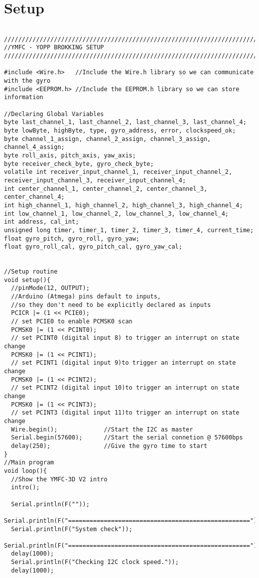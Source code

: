 \section{Setup}

\begin{lstlisting}

///////////////////////////////////////////////////////////////////////////////////////
//YMFC - YOPP BROKKING SETUP
///////////////////////////////////////////////////////////////////////////////////////

#include <Wire.h>   //Include the Wire.h library so we can communicate with the gyro
#include <EEPROM.h> //Include the EEPROM.h library so we can store information

//Declaring Global Variables
byte last_channel_1, last_channel_2, last_channel_3, last_channel_4;
byte lowByte, highByte, type, gyro_address, error, clockspeed_ok;
byte channel_1_assign, channel_2_assign, channel_3_assign, channel_4_assign;
byte roll_axis, pitch_axis, yaw_axis;
byte receiver_check_byte, gyro_check_byte;
volatile int receiver_input_channel_1, receiver_input_channel_2, 
receiver_input_channel_3, receiver_input_channel_4;
int center_channel_1, center_channel_2, center_channel_3, center_channel_4;
int high_channel_1, high_channel_2, high_channel_3, high_channel_4;
int low_channel_1, low_channel_2, low_channel_3, low_channel_4;
int address, cal_int;
unsigned long timer, timer_1, timer_2, timer_3, timer_4, current_time;
float gyro_pitch, gyro_roll, gyro_yaw;
float gyro_roll_cal, gyro_pitch_cal, gyro_yaw_cal;


//Setup routine
void setup(){
  //pinMode(12, OUTPUT);
  //Arduino (Atmega) pins default to inputs, 
  //so they don't need to be explicitly declared as inputs
  PCICR |= (1 << PCIE0);    
  // set PCIE0 to enable PCMSK0 scan
  PCMSK0 |= (1 << PCINT0);  
  // set PCINT0 (digital input 8) to trigger an interrupt on state change
  PCMSK0 |= (1 << PCINT1);  
  // set PCINT1 (digital input 9)to trigger an interrupt on state change
  PCMSK0 |= (1 << PCINT2);  
  // set PCINT2 (digital input 10)to trigger an interrupt on state change
  PCMSK0 |= (1 << PCINT3);  
  // set PCINT3 (digital input 11)to trigger an interrupt on state change
  Wire.begin();             //Start the I2C as master
  Serial.begin(57600);      //Start the serial connetion @ 57600bps
  delay(250);               //Give the gyro time to start 
}
//Main program
void loop(){
  //Show the YMFC-3D V2 intro
  intro();
  
  Serial.println(F(""));
  Serial.println(F("==================================================="));
  Serial.println(F("System check"));
  Serial.println(F("==================================================="));
  delay(1000);
  Serial.println(F("Checking I2C clock speed."));
  delay(1000);
  

\end{lstlisting}
